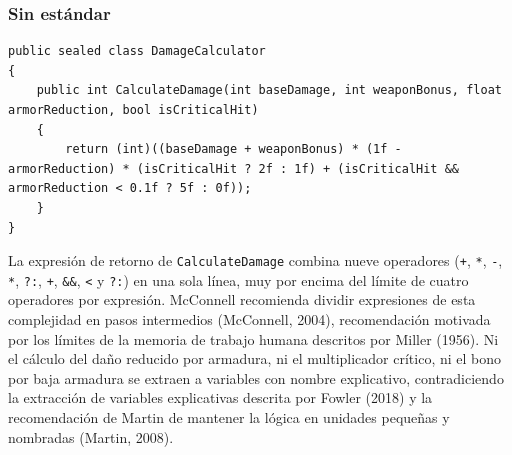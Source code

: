\subsubsection{Sin estándar}

\begin{lstlisting}[style=csharpstyle]
public sealed class DamageCalculator
{
    public int CalculateDamage(int baseDamage, int weaponBonus, float armorReduction, bool isCriticalHit)
    {
        return (int)((baseDamage + weaponBonus) * (1f - armorReduction) * (isCriticalHit ? 2f : 1f) + (isCriticalHit && armorReduction < 0.1f ? 5f : 0f));
    }
}
\end{lstlisting}

La expresión de retorno de \texttt{CalculateDamage} combina nueve operadores (\texttt{+}, \texttt{*}, \texttt{-}, \texttt{*}, \texttt{?:}, \texttt{+}, \texttt{\&\&}, \texttt{<} y \texttt{?:}) en una sola línea, muy por encima del límite de cuatro operadores por expresión. McConnell recomienda dividir expresiones de esta complejidad en pasos intermedios (McConnell, 2004), recomendación motivada por los límites de la memoria de trabajo humana descritos por Miller (1956). Ni el cálculo del daño reducido por armadura, ni el multiplicador crítico, ni el bono por baja armadura se extraen a variables con nombre explicativo, contradiciendo la extracción de variables explicativas descrita por Fowler (2018) y la recomendación de Martin de mantener la lógica en unidades pequeñas y nombradas (Martin, 2008).

